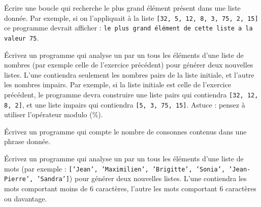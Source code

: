 
\begin{exercice}
Écrire une boucle qui recherche le plus grand élément présent dans une liste
donnée. Par exemple, si on l’appliquait à la liste \texttt{[32, 5, 12, 8, 3, 75,
2, 15]} ce programme devrait afficher : \texttt{le plus grand élément de cette liste a
la valeur 75}.
\end{exercice}

\begin{exercice}
Écrivez un programme qui analyse un par un tous les éléments d’une liste de
nombres (par exemple celle de l’exercice précédent) pour générer deux nouvelles
listes. L’une contiendra seulement les nombres pairs de la liste initiale, et
l’autre les nombres impairs. Par exemple, si la liste initiale est celle de
l’exercice précédent, le programme devra construire une liste pairs qui
contiendra \texttt{[32, 12, 8, 2]}, et une liste impairs qui contiendra
\texttt{[5, 3, 75, 15]}. Astuce : pensez à utiliser l’opérateur modulo (\%).
\end{exercice}

\begin{exercice}
Écrivez un programme qui compte le nombre de consonnes contenus dans une phrase
donnée.
\end{exercice}

\begin{exercice}
Écrivez un programme qui analyse un par un tous les éléments d’une liste
de mots (par exemple : \texttt{['Jean', 'Maximilien', 'Brigitte', 'Sonia',
'Jean-Pierre', 'Sandra']}) pour générer deux nouvelles listes. L’une contiendra
les mots comportant moins de 6 caractères, l’autre les mots comportant 6
caractères ou davantage.
\end{exercice}

